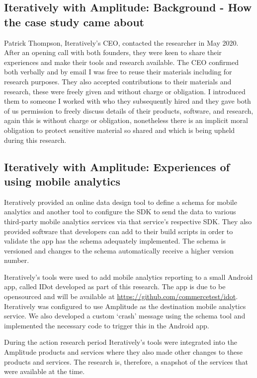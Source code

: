\subsection{Iteratively with Amplitude: Background - How the case study came about}
Patrick Thompson, Iteratively's CEO, contacted the researcher in May 2020. After an opening call with both founders, they were keen to share their experiences and make their tools and research available. The CEO confirmed both verbally and by email I was free to reuse their materials including for research purposes. They also accepted contributions to their materials and research, these were freely given and without charge or obligation. I introduced them to someone I worked with who they subsequently hired and they gave both of us permission to freely discuss details of their products, software, and research, again this is without charge or obligation, nonetheless there is an implicit moral obligation to protect sensitive material so shared and which is being upheld during this research.

\subsection{Iteratively with Amplitude: Experiences of using mobile analytics}
Iteratively provided an online data design tool to define a schema for mobile analytics and another tool to configure the SDK to send the data to various third-party mobile analytics services via that service's respective SDK. They also provided software that developers can add to their build scripts in order to validate the app has the schema adequately implemented. The schema is versioned and changes to the schema automatically receive a higher version number.

Iteratively's tools were used to add mobile analytics reporting to a small Android app, called IDot developed as part of this research. The app is due to be opensourced and will be available at \url{https://github.com/commercetest/idot}. Iteratively was configured to use Amplitude as the destination mobile analytics service. We also developed a custom `crash' message using the schema tool and implemented the necessary code to trigger this in the Android app.

During the action research period Iteratively's tools were integrated into the Amplitude products and services where they also made other changes to these products and services. The research is, therefore, a snapshot of the services that were available at the time.

